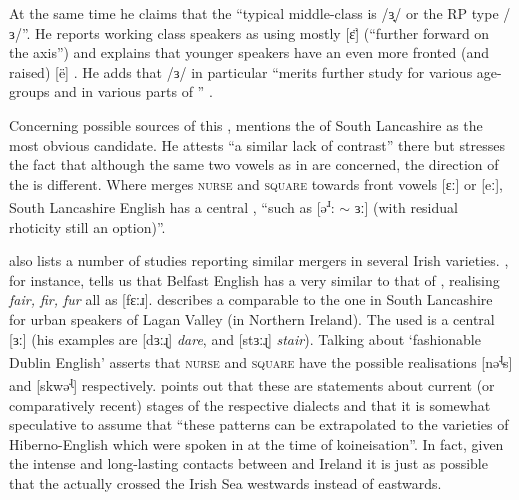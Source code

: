 At the same time he claims that the ``typical middle-class  is /ɜ̟/ or the RP type /ɜ/''. He reports working class speakers as using mostly [ɛ̈] (``further forward on the axis'') and explains that younger speakers have an even more fronted (and raised) [ë] \citep[271]{knowles1973}.
He adds that /ɜ/ in particular ``merits further study for various age-groups and in various parts of '' \citeyearpar[320]{knowles1973}.

Concerning possible sources of this , \citet[128]{honeybone2007} mentions the  of South Lancashire as the most obvious candidate.
He attests ``a similar lack of contrast'' there but stresses the fact that although the same two vowels as in  are concerned, the direction of the  is different.
Where  merges \textsc{nurse} and \textsc{square} towards front vowels [ɛː] or [eː], South Lancashire English has a central , ``such as [ə\textsuperscript{ɹ}: \(\sim\) ɜː] (with residual rhoticity still an option)''.

\parencite{honeybone2007} also lists a number of studies reporting similar mergers in several Irish varieties.
\citet{wells1982}, for instance, tells us that Belfast English has a  very similar to that of , realising \emph{fair, fir, fur} all as [fɛːɹ].
\citet[cf.][48]{harris1985} describes a  comparable to the one in South Lancashire for urban speakers of Lagan Valley (in Northern Ireland).
The  used is a central [ɜː] (his examples are [dɜːɻ] \emph{dare}, and [stɜːɻ] \emph{stair}).
Talking about `fashionable Dublin English' \citet{hickey1999} asserts that \textsc{nurse} and \textsc{square} have the possible realisations [nə\textsuperscript{ɻ}s] and [skwə\textsuperscript{ɻ}] respectively.
\parencite[128]{honeybone2007} points out that these are statements about current (or comparatively recent) stages of the respective dialects and that it is somewhat speculative to assume that ``these patterns can be extrapolated to the varieties of Hiberno-English which were spoken in  at the time of koineisation''.
In fact, given the intense and long-lasting contacts between  and Ireland it is just as possible that the  actually crossed the Irish Sea westwards instead of eastwards.

